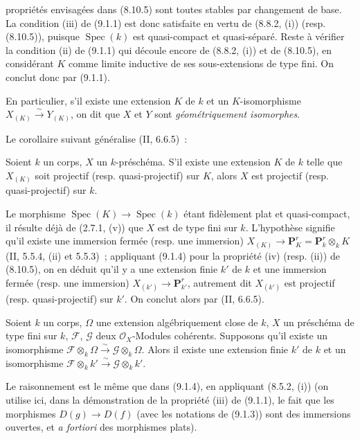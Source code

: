 propriétés envisagées dans (8.10.5) sont toutes stables par changement de base.
La condition (iii) de (9.1.1) est donc satisfaite en vertu de (8.8.2, (i))
(resp. (8.10.5)), puisque $\operatorname{Spec}(k)$ est quasi-compact et
quasi-séparé. Reste à vérifier la condition (ii) de (9.1.1) qui découle encore
de (8.8.2, (i)) et de (8.10.5), en considérant $K$ comme limite inductive de
ses sous-extensions de type fini. On conclut donc par (9.1.1).

En particulier, s'il existe une extension $K$ de $k$ et un $K$-isomorphisme
$X_{(K)}\xrightarrow{\sim}Y_{(K)}$, on dit que $X$ et $Y$ sont
\emph{géométriquement isomorphes}.

Le corollaire suivant généralise (II, 6.6.5)~:

\begin{corollary}[9.1.5]
\label{IV.9.1.5-fr}
Soient $k$ un corps, $X$ un $k$-préschéma. S'il existe une extension $K$ de
$k$ telle que $X_{(K)}$ soit projectif (resp. quasi-projectif) sur $K$, alors
$X$ est projectif (resp. quasi-projectif) sur $k$.
\end{corollary}

Le morphisme $\operatorname{Spec}(K)\to\operatorname{Spec}(k)$ étant
fidèlement plat et quasi-compact, il résulte déjà de (2.7.1, (v)) que $X$ est
de type fini sur $k$. L'hypothèse signifie qu'il existe une immersion fermée
(resp. une immersion) $X_{(K)}\to\mathbf P_K^r=\mathbf P_k^r\otimes_k K$
(II, 5.5.4, (ii) et 5.5.3)~; appliquant (9.1.4) pour la propriété (iv)
(resp. (ii)) de (8.10.5), on en déduit qu'il y a une extension finie $k'$ de
$k$ et une immersion fermée (resp. une immersion)
$X_{(k')}\to\mathbf P_{k'}^r$, autrement dit $X_{(k')}$ est projectif
(resp. quasi-projectif) sur $k'$. On conclut alors par (II, 6.6.5).

\begin{proposition}[9.1.6]
\label{IV.9.1.6-fr}
Soient $k$ un corps, $\Omega$ une extension algébriquement close de $k$,
$X$ un préschéma de type fini sur $k$, $\mathcal F$, $\mathcal G$ deux
$\mathcal O_X$-Modules cohérents. Supposons qu'il existe un isomorphisme
$\mathcal F\otimes_k\Omega\xrightarrow{\sim}\mathcal G\otimes_k\Omega$.
Alors il existe une extension finie $k'$ de $k$ et un isomorphisme
$\mathcal F\otimes_k k'\xrightarrow{\sim}\mathcal G\otimes_k k'$.
\end{proposition}

Le raisonnement est le même que dans (9.1.4), en appliquant (8.5.2, (i))
(on utilise ici, dans la démonstration de la propriété (iii) de (9.1.1), le
fait que les morphismes $D(g)\to D(f)$ (avec les notations de (9.1.3)) sont
des immersions ouvertes, et \emph{a fortiori} des morphismes plats).

